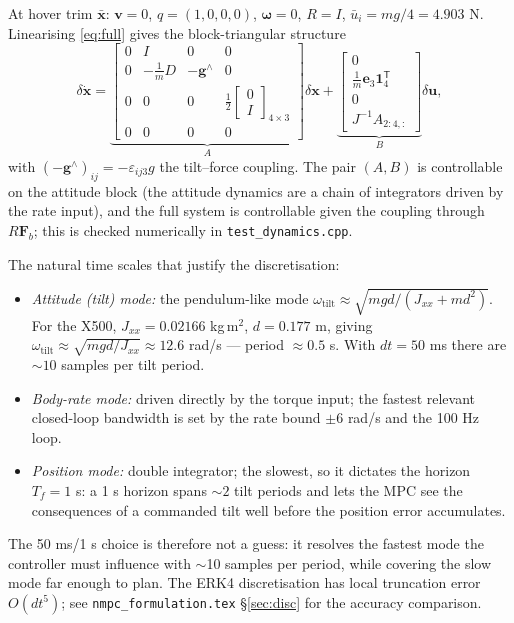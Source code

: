 \documentclass[11pt]{article}
\begin{document}
At hover trim $\bar{\bm x}$: $\bm v = 0$, $q = (1,0,0,0)$, $\bm\omega = 0$,
$R = I$, $\bar u_i = mg/4 = 4.903$ N. Linearising \eqref{eq:full} gives the block-triangular
structure
\begin{equation}
  \delta \dot{\bm x} =
  \underbrace{\begin{bmatrix}
    0 & I & 0 & 0 \\
    0 & -\frac1m D & -\bm g^\wedge & 0 \\
    0 & 0 & 0 & \frac12 \begin{bmatrix} 0\\ I \end{bmatrix}_{\!4\times3}\\
    0 & 0 & 0 & 0
  \end{bmatrix}}_{A}
  \delta \bm x
  + \underbrace{\begin{bmatrix}
    0 \\ \frac1m \bm e_3 \bm 1_4^{\mathsf T} \\ 0 \\ J^{-1} A_{2:4,:}
  \end{bmatrix}}_{B}
  \delta \bm u,
  \label{eq:lin}
\end{equation}
with $(-\bm g^\wedge)_{ij} = -\varepsilon_{ij3}g$ the tilt--force coupling. The pair $(A,B)$
is controllable on the attitude block (the attitude dynamics are a chain of integrators
driven by the rate input), and the full system is controllable given the coupling through
$R \bm F_b$; this is checked numerically in \texttt{test\_dynamics.cpp}.

The natural time scales that justify the discretisation:
\begin{itemize}
  \item \emph{Attitude (tilt) mode:} the pendulum-like mode
        $\omega_\mathrm{tilt} \approx \sqrt{mg d / (J_{xx} + m d^2)}$. For the X500,
        $J_{xx} = 0.02166$ kg\,m$^2$, $d = 0.177$ m, giving
        $\omega_\mathrm{tilt} \approx \sqrt{mg d / J_{xx}} \approx 12.6$ rad/s —
        period $\approx 0.5$ s. With $dt = 50$ ms there are $\sim 10$ samples per tilt
        period.
  \item \emph{Body-rate mode:} driven directly by the torque input; the fastest relevant
        closed-loop bandwidth is set by the rate bound $\pm 6$ rad/s and the 100 Hz loop.
  \item \emph{Position mode:} double integrator; the slowest, so it dictates the horizon
        $T_f = 1$ s: a 1 s horizon spans $\sim 2$ tilt periods and lets the MPC see the
        consequences of a commanded tilt well before the position error accumulates.
\end{itemize}
The 50 ms/1 s choice is therefore not a guess: it resolves the fastest mode the controller
must influence with $\sim$10 samples per period, while covering the slow mode far enough to
plan. The ERK4 discretisation has local truncation error $O(dt^5)$; see
\texttt{nmpc\_formulation.tex} \S\ref{sec:disc} for the accuracy comparison.
\end{document}
